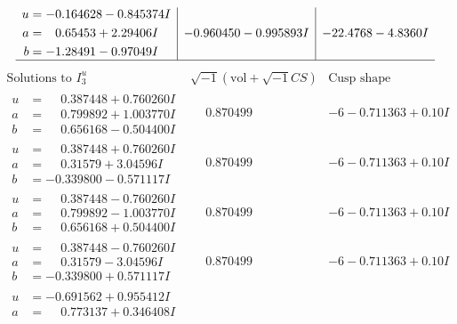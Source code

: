 \documentclass[1p]{elsarticle_modified}
\theoremstyle{definition}
\newcommand{\I}{\sqrt{-1}}
\begin{document}
$$\begin{array}{c|c|c}
\begin{aligned}
u &= -0.164628 - 0.845374 I \\
a &= \phantom{-}0.65453 + 2.29406 I \\
b &= -1.28491 - 0.97049 I\end{aligned}
 & -0.960450 - 0.995893 I & -22.4768 - 4.8360 I\\
 \hline 
 \end{array}$$\newpage$$\begin{array}{c|c|c}  
\text{Solutions to }I^u_{3}& \I (\text{vol} + \sqrt{-1}CS) & \text{Cusp shape}\\
 \hline 
\begin{aligned}
u &= \phantom{-}0.387448 + 0.760260 I \\
a &= \phantom{-}0.799892 + 1.003770 I \\
b &= \phantom{-}0.656168 - 0.504400 I\end{aligned}
 & \phantom{-}0.870499\phantom{ +0.000000I} &                  -6
-0.711363 + 0. 10   I\phantom{ +0.000000I} \\ \hline\begin{aligned}
u &= \phantom{-}0.387448 + 0.760260 I \\
a &= \phantom{-}0.31579 + 3.04596 I \\
b &= -0.339800 - 0.571117 I\end{aligned}
 & \phantom{-}0.870499\phantom{ +0.000000I} &                  -6
-0.711363 + 0. 10   I\phantom{ +0.000000I} \\ \hline\begin{aligned}
u &= \phantom{-}0.387448 - 0.760260 I \\
a &= \phantom{-}0.799892 - 1.003770 I \\
b &= \phantom{-}0.656168 + 0.504400 I\end{aligned}
 & \phantom{-}0.870499\phantom{ +0.000000I} &                  -6
-0.711363 + 0. 10   I\phantom{ +0.000000I} \\ \hline\begin{aligned}
u &= \phantom{-}0.387448 - 0.760260 I \\
a &= \phantom{-}0.31579 - 3.04596 I \\
b &= -0.339800 + 0.571117 I\end{aligned}
 & \phantom{-}0.870499\phantom{ +0.000000I} &                  -6
-0.711363 + 0. 10   I\phantom{ +0.000000I} \\ \hline\begin{aligned}
u &= -0.691562 + 0.955412 I \\
a &= \phantom{-}0.773137 + 0.346408 I \\

\end{aligned}
\end{array}$$
\end{document}
